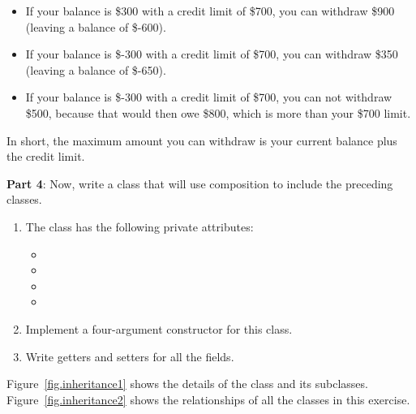 \begin{exercise}
\begin{enumerate}
\begin{itemize}
\item If your balance is \$300 with a credit limit of \$700, you can withdraw \$900 (leaving a balance of \$-600).
\item If your balance is \$-300 with a credit limit of \$700, you can withdraw \$350 (leaving a balance of \$-650).
\item If your balance is \$-300 with a credit limit of \$700, you can not withdraw \$500, because that would then owe \$800, which is more than your \$700 limit.
\end{itemize}

In short, the maximum amount you can withdraw is your current balance plus the credit limit.


\end{enumerate}

{\bf Part 4}: Now, write a  class that will use composition to include the preceding classes.

\begin{enumerate}
\item The  class has the following private attributes:

\begin{itemize}
\item {}
\item {}
\item {}
\item {}
\end{itemize}

\item Implement a four-argument constructor for this class.

\item Write getters and setters for all the fields.
\end{enumerate}

Figure~\ref{fig.inheritance1} shows the details of the  class and its subclasses. Figure~\ref{fig.inheritance2} shows the relationships of all the classes in this exercise.


\end{exercise}

